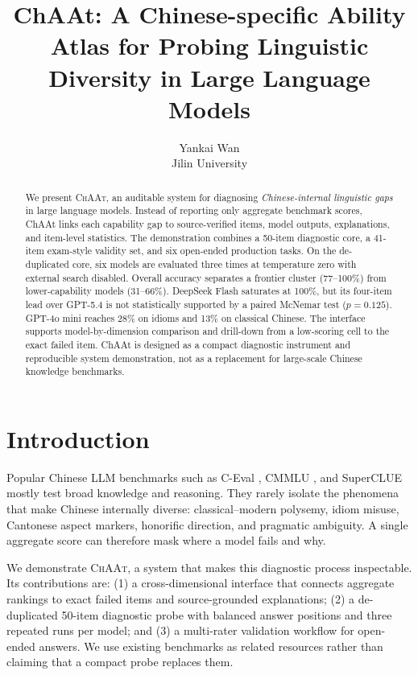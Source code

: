 \documentclass[11pt]{article}
\title{ChAAt: A Chinese-specific Ability Atlas for Probing Linguistic Diversity in Large Language Models}
\author{Yankai Wan \\
Jilin University}
\date{}
\begin{document}
\maketitle

\begin{abstract}
We present \textsc{ChAAt}, an auditable system for diagnosing \emph{Chinese-internal linguistic gaps} in large language models. Instead of reporting only aggregate benchmark scores, ChAAt links each capability gap to source-verified items, model outputs, explanations, and item-level statistics. The demonstration combines a 50-item diagnostic core, a 41-item exam-style validity set, and six open-ended production tasks. On the de-duplicated core, six models are evaluated three times at temperature zero with external search disabled. Overall accuracy separates a frontier cluster (77--100\%) from lower-capability models (31--66\%). DeepSeek Flash saturates at 100\%, but its four-item lead over GPT-5.4 is not statistically supported by a paired McNemar test ($p{=}0.125$). GPT-4o mini reaches 28\% on idioms and 13\% on classical Chinese. The interface supports model-by-dimension comparison and drill-down from a low-scoring cell to the exact failed item. ChAAt is designed as a compact diagnostic instrument and reproducible system demonstration, not as a replacement for large-scale Chinese knowledge benchmarks.
\end{abstract}

\section{Introduction}

Popular Chinese LLM benchmarks such as C-Eval \citep{huang-etal-2023-ceval}, CMMLU \citep{li-etal-2024-cmmlu}, and SuperCLUE \citep{xu-etal-2023-superclue} mostly test broad knowledge and reasoning. They rarely isolate the phenomena that make Chinese internally diverse: classical--modern polysemy, idiom misuse, Cantonese aspect markers, honorific direction, and pragmatic ambiguity. A single aggregate score can therefore mask where a model fails and why.

We demonstrate \textsc{ChAAt}, a system that makes this diagnostic process inspectable. Its contributions are: (1) a cross-dimensional interface that connects aggregate rankings to exact failed items and source-grounded explanations; (2) a de-duplicated 50-item diagnostic probe with balanced answer positions and three repeated runs per model; and (3) a multi-rater validation workflow for open-ended answers. We use existing benchmarks as related resources rather than claiming that a compact probe replaces them.
\end{document}
